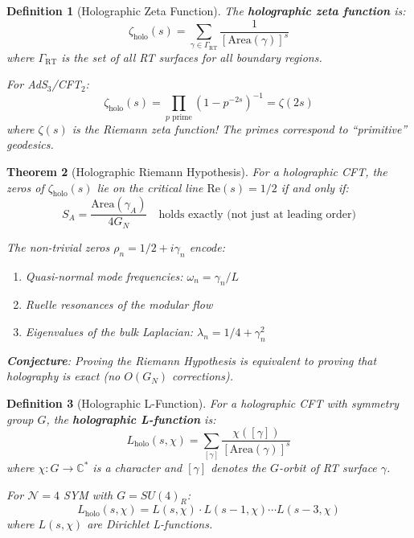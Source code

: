 \documentclass[12pt,a4paper]{article}
\newtheorem{theorem}{Theorem}[section]
\newtheorem{definition}[theorem]{Definition}
\begin{document}
\begin{definition}[Holographic Zeta Function]\label{def:holo-zeta}
The \textbf{holographic zeta function} is:
\begin{equation}
\zeta_{\text{holo}}(s) = \sum_{\gamma \in \Gamma_{\text{RT}}} \frac{1}{[\text{Area}(\gamma)]^s}
\end{equation}
where $\Gamma_{\text{RT}}$ is the set of all RT surfaces for all boundary regions.

For AdS$_3$/CFT$_2$:
\begin{equation}
\zeta_{\text{holo}}(s) = \prod_{p \text{ prime}} \left(1 - p^{-2s}\right)^{-1} = \zeta(2s)
\end{equation}
where $\zeta(s)$ is the Riemann zeta function! The primes correspond to ``primitive'' geodesics.
\end{definition}

\begin{theorem}[Holographic Riemann Hypothesis]\label{thm:holo-riemann}
For a holographic CFT, the zeros of $\zeta_{\text{holo}}(s)$ lie on the critical line $\text{Re}(s) = 1/2$ if and only if:
\begin{equation}
S_A = \frac{\text{Area}(\gamma_A)}{4G_N} \quad \text{holds exactly (not just at leading order)}
\end{equation}

The non-trivial zeros $\rho_n = 1/2 + i\gamma_n$ encode:
\begin{enumerate}
    \item Quasi-normal mode frequencies: $\omega_n = \gamma_n / L$
    \item Ruelle resonances of the modular flow
    \item Eigenvalues of the bulk Laplacian: $\lambda_n = 1/4 + \gamma_n^2$
\end{enumerate}

\textbf{Conjecture}: Proving the Riemann Hypothesis is equivalent to proving that holography is exact (no $O(G_N)$ corrections).
\end{theorem}

\begin{definition}[Holographic L-Function]\label{def:holo-L}
For a holographic CFT with symmetry group $G$, the \textbf{holographic L-function} is:
\begin{equation}
L_{\text{holo}}(s, \chi) = \sum_{[\gamma]} \frac{\chi([\gamma])}{[\text{Area}(\gamma)]^s}
\end{equation}
where $\chi: G \to \mathbb{C}^*$ is a character and $[\gamma]$ denotes the $G$-orbit of RT surface $\gamma$.

For $\mathcal{N}=4$ SYM with $G = SU(4)_R$:
\begin{equation}
L_{\text{holo}}(s, \chi) = L(s, \chi) \cdot L(s-1, \chi) \cdots L(s-3, \chi)
\end{equation}
where $L(s, \chi)$ are Dirichlet L-functions.
\end{definition}
\end{document}

